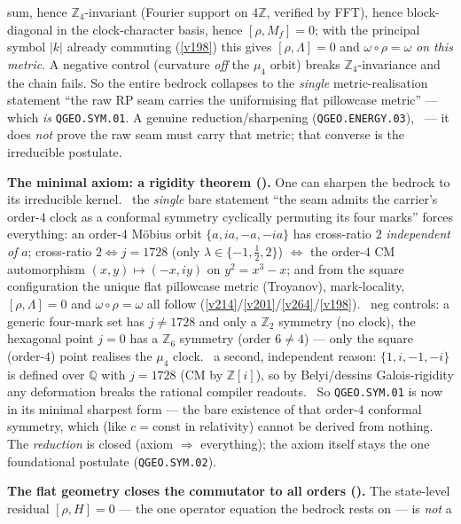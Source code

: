 \documentclass[11pt,a4paper]{article}
\newcommand{\Z}{\mathbb Z}
\begin{document}
\begin{keybox}
sum, hence $\Z_4$-invariant (Fourier support on $4\Z$, verified by FFT), hence block-diagonal in the
clock-character basis, hence $[\rho,M_f]=0$; with the principal symbol $|k|$ already commuting (\vref{v198})
this gives $[\rho,\Lambda]=0$ and $\omega\circ\rho=\omega$ \emph{on this metric}. A negative control (curvature
\emph{off} the $\mu_4$ orbit) breaks $\Z_4$-invariance and the chain fails. So the entire bedrock collapses
to the \emph{single} metric-realisation statement ``the raw RP seam carries the uniformising flat pillowcase
metric'' --- which \emph{is} \texttt{QGEO.SYM.01}. A genuine reduction/sharpening (\texttt{QGEO.ENERGY.03}),
\mO\ --- it does \emph{not} prove the raw seam must carry that metric; that converse is the irreducible
postulate.
\par\smallskip\noindent\textbf{The minimal axiom: a rigidity theorem ().}
One can sharpen the bedrock to its irreducible kernel. \mE\ the \emph{single} bare statement ``the seam admits
the carrier's order-$4$ clock as a conformal symmetry cyclically permuting its four marks'' forces everything:
an order-$4$ M\"obius orbit $\{a,ia,-a,-ia\}$ has cross-ratio $2$ \emph{independent of} $a$; cross-ratio $2
\Leftrightarrow j{=}1728$ (only $\lambda\in\{-1,\tfrac12,2\}$) $\Leftrightarrow$ the order-$4$ CM automorphism
$(x,y)\mapsto(-x,iy)$ on $y^2{=}x^3{-}x$; and from the square configuration the unique flat pillowcase metric
(Troyanov), mark-locality, $[\rho,\Lambda]{=}0$ and $\omega\circ\rho{=}\omega$ all follow (\vref{v214}/\vref{v201}/\vref{v264}/\vref{v198}).
\mE\ neg controls: a generic four-mark set has $j\neq1728$ and only a $\Z_2$ symmetry (no clock), the
hexagonal point $j{=}0$ has a $\Z_6$ symmetry (order $6\neq4$) --- only the square (order-$4$) point realises
the $\mu_4$ clock. \mC\ a second, independent reason: $\{1,i,-1,-i\}$ is defined over $\mathbb Q$ with $j{=}1728$
(CM by $\Z[i]$), so by Belyi/dessins Galois-rigidity any deformation breaks the rational compiler readouts.
\mO\ So \texttt{QGEO.SYM.01} is now in its minimal sharpest form --- the bare existence of that order-$4$
conformal symmetry, which (like $c{=}$const in relativity) cannot be derived from nothing. The \emph{reduction}
is closed (axiom $\Rightarrow$ everything); the axiom itself stays the one foundational postulate (\texttt{QGEO.SYM.02}).
\par\smallskip\noindent\textbf{The flat geometry closes the commutator to all orders ().}
The state-level residual $[\rho,H]{=}0$ --- the one operator equation the bedrock rests on --- is \emph{not} a

\end{keybox}
\end{document}
